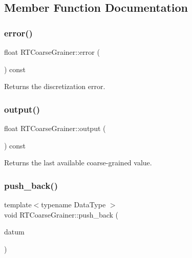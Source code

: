 \subsection{Member Function Documentation}
\mbox{\label{classRTCoarseGrainer_a0a2a0cf51154b2ed00d18e397e0e0c95}} 
\subsubsection{\texorpdfstring{error()}{error()}}
{\footnotesize\ttfamily float R\+T\+Coarse\+Grainer\+::error (\begin{DoxyParamCaption}{ }\end{DoxyParamCaption}) const\hspace{0.3cm}{\ttfamily [inline]}}



Returns the discretization error. 

\mbox{\label{classRTCoarseGrainer_a2d0cd547401422150d1293a156abc86e}} 
\subsubsection{\texorpdfstring{output()}{output()}}
{\footnotesize\ttfamily float R\+T\+Coarse\+Grainer\+::output (\begin{DoxyParamCaption}{ }\end{DoxyParamCaption}) const\hspace{0.3cm}{\ttfamily [inline]}}



Returns the last available coarse-\/grained value. 

\mbox{\label{classRTCoarseGrainer_a92ba58efd22b7c3c9e79cd4d5e065e70}} 
\subsubsection{\texorpdfstring{push\+\_\+back()}{push\_back()}}
{\footnotesize\ttfamily template$<$typename Data\+Type $>$ \\
void R\+T\+Coarse\+Grainer\+::push\+\_\+back (\begin{DoxyParamCaption}\item[{const Data\+Type}]{datum }\end{DoxyParamCaption})\hspace{0.3cm}{\ttfamily [inline]}}



